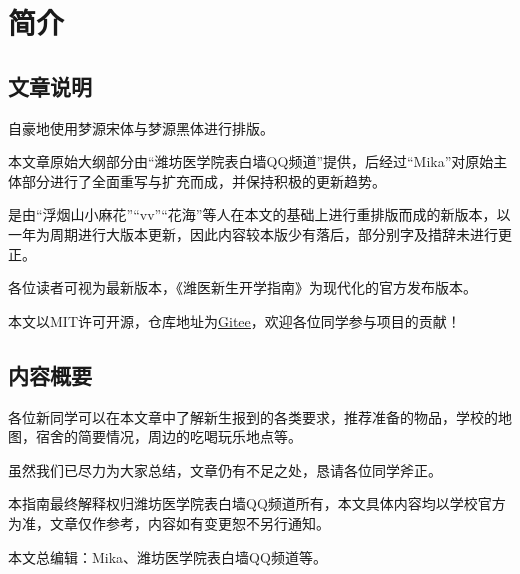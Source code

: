 \chapter[简介]{简介}
\section[文章说明]{文章说明}

自豪地使用梦源宋体与梦源黑体进行排版。

本文章原始大纲部分由“潍坊医学院表白墙QQ频道”提供，后经过“Mika”对原始主体部分进行了全面重写与扩充而成，并保持积极的更新趋势。

\textbf{}是由“浮烟山小麻花”“vv”“花海”等人在本文的基础上进行重排版而成的新版本，以一年为周期进行大版本更新，因此内容较本版少有落后，部分别字及措辞未进行更正。

各位读者可视\textbf{}为最新版本，《潍医新生开学指南》为现代化的官方发布版本。

本文以MIT许可开源，仓库地址为\uline{\href{https://gitee.com/mikazo/guide_for_freshman}{Gitee}}，欢迎各位同学参与项目的贡献！

\section[内容概要]{内容概要}

各位新同学可以在本文章中了解新生报到的各类要求，推荐准备的物品，学校的地图，宿舍的简要情况，周边的吃喝玩乐地点等。

虽然我们已尽力为大家总结，文章仍有不足之处，恳请各位同学斧正。

本指南最终解释权归潍坊医学院表白墙QQ频道所有，本文具体内容均以学校官方为准，文章仅作参考，内容如有变更恕不另行通知。

本文总编辑：Mika、潍坊医学院表白墙QQ频道等。